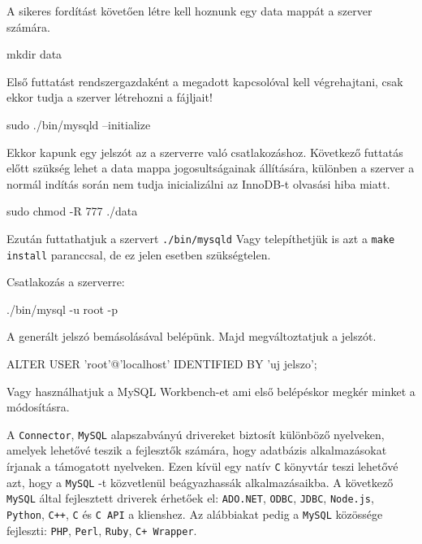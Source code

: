 A sikeres fordítást követően létre kell hoznunk egy data mappát a szerver számára.
\begin{python}
 mkdir data
\end{python}
Első futtatást rendszergazdaként a megadott kapcsolóval kell végrehajtani, csak ekkor tudja a szerver létrehozni a fájljait!
\begin{python}
 sudo ./bin/mysqld --initialize
\end{python}
Ekkor kapunk egy jelszót az a szerverre való csatlakozáshoz. Következő futtatás előtt szükség lehet a data mappa jogosultságainak állítására, különben a szerver a normál indítás során nem tudja inicializálni az InnoDB-t olvasási hiba miatt.
\begin{python}
 sudo chmod -R 777 ./data
\end{python}
Ezután futtathatjuk a szervert
\texttt{./bin/mysqld}
Vagy telepíthetjük is azt a \texttt{make install} paranccsal, de ez jelen esetben szükségtelen.



Csatlakozás a szerverre:
\begin{python}
 ./bin/mysql -u root -p
\end{python}
A generált jelszó bemásolásával belépünk. Majd megváltoztatjuk a jelszót.
\begin{python}
ALTER USER 'root'@'localhost' IDENTIFIED BY 'uj jelszo';
\end{python}
Vagy használhatjuk a MySQL Workbench-et ami első belépéskor megkér minket a módosításra.



A \texttt{Connector}, \texttt{MySQL} alapszabványú drivereket biztosít különböző nyelveken, amelyek lehetővé teszik a fejlesztők számára, hogy adatbázis alkalmazásokat írjanak a támogatott nyelveken. Ezen kívül egy natív \texttt{C} könyvtár teszi lehetővé azt, hogy a \texttt{MySQL} -t közvetlenül beágyazhassák alkalmazásaikba. \newline
A következő \texttt{MySQL} által fejlesztett driverek érhetőek el: \newline
\texttt{ADO.NET}, \texttt{ODBC}, \texttt{JDBC}, \texttt{Node.js}, \texttt{Python}, \texttt{C++}, \texttt{C} és \texttt{C API} a klienshez. \newline
Az alábbiakat pedig a \texttt{MySQL} közössége fejleszti:\newline
\texttt{PHP}, \texttt{Perl}, \texttt{Ruby}, \texttt{C+ Wrapper}.


